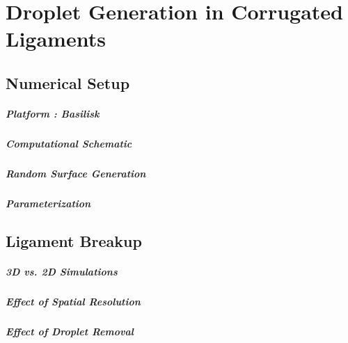 \setchapterpreamble[u]{\margintoc}
\chapter{Droplet Generation in Corrugated Ligaments}


\section{Numerical Setup}

\paragraph{Platform : Basilisk}
\blindtext

\paragraph{Computational Schematic}
\blindtext

\paragraph{Random Surface Generation}
\blindtext

\paragraph{Parameterization}
\blindtext


\section{Ligament Breakup}

\paragraph{3D vs. 2D Simulations}
\blindtext

\paragraph{Effect of Spatial Resolution}
\blindtext

\paragraph{Effect of Droplet Removal}
\blindtext

